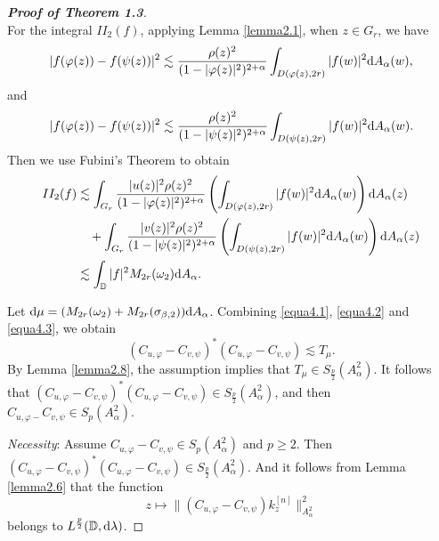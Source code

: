 \documentclass[preprint,12pt,times]{elsarticle}
\theoremstyle{definition}
\theoremstyle{remark}
\numberwithin{equation}{section}
\begin{document}
\begin{proof}[{\bf Proof of Theorem 1.3}]
\begin{equation}
\end{equation}
For the integral $II_2(f)$, applying Lemma \ref{lemma2.1}, when $z\in G_r$, we have
\begin{equation*}
|f(\varphi(z))-f(\psi(z))|^2\lesssim \frac{\rho(z)^2}{(1-|\varphi(z)|^2)^{2+\alpha}}\int_{D(\varphi(z),2r)}|f(w)|^2{\rm d}A_{\alpha}(w),
\end{equation*}
and
\begin{equation*}
|f(\varphi(z))-f(\psi(z))|^2\lesssim \frac{\rho(z)^2}{(1-|\psi(z)|^2)^{2+\alpha}}\int_{D(\psi(z),2r)}|f(w)|^2{\rm d}A_{\alpha}(w).
\end{equation*}
Then we use Fubini's Theorem to obtain
\begin{equation}\label{equa4.3}
\begin{split}
II_2(f)&\lesssim\int_{G_r}\frac{|u(z)|^2\rho(z)^2}{(1-|\varphi(z)|^2)^{2+\alpha}}\left(\int_{D(\varphi(z),2r)}|f(w)|^2{\rm d}A_{\alpha}(w)\right){\rm d}A_{\alpha}(z)\\
&\quad +\int_{G_r}\frac{|v(z)|^2\rho(z)^2}{(1-|\psi(z)|^2)^{2+\alpha}}\left(\int_{D(\psi(z),2r)}|f(w)|^2{\rm d}A_{\alpha}(w)\right){\rm d}A_{\alpha}(z)\\
&\lesssim \int_{\mathbb{D}}|f|^2M_{2r}(\omega_2){\rm d}A_{\alpha}.
\end{split}
\end{equation}

Let ${\rm d}\mu=(M_{2r}(\omega_2)+M_{2r}(\sigma_{\beta,2})){\rm d}A_{\alpha}$. Combining \eqref{equa4.1}, \eqref{equa4.2} and \eqref{equa4.3}, we obtain
\[(C_{u,\varphi}-C_{v,\psi})^*(C_{u,\varphi}-C_{v,\psi})\lesssim T_{\mu}.\]
By Lemma \ref{lemma2.8}, the assumption implies that $T_{\mu}\in S_{\frac{p}{2}}(A_{\alpha}^2)$. It follows that $(C_{u,\varphi}-C_{v,\psi})^*(C_{u,\varphi}-C_{v,\psi})\in S_{\frac{p}{2}}(A_{\alpha}^2)$, and then $C_{u,\varphi-}C_{v,\psi}\in S_p(A_{\alpha}^2)$.

{\it Necessity}: Assume $C_{u,\varphi}-C_{v,\psi}\in S_p(A_{\alpha}^2)$ and $p\geq 2$. Then $(C_{u,\varphi}-C_{v,\psi})^*(C_{u,\varphi}-C_{v,\psi})\in S_{\frac{p}{2}}(A_{\alpha}^2)$. And it follows from Lemma \ref{lemma2.6} that the function
\[z\mapsto \|(C_{u,\varphi}-C_{v,\psi})k_z^{[n]}\|_{A_{\alpha}^2}^2\]
belongs to $L^{\frac{p}{2}}(\mathbb{D},{\rm d}\lambda)$.


\end{proof}
\end{document}
